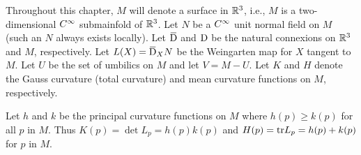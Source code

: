 Throughout this chapter, $M$ will denote a surface in $\mathbb{R}^3$, i.e., $M$ is a two-dimensional $C^\infty$ submainfold of $\mathbb{R}^{3}$. Let $N$ be a $C^\infty$ unit normal field on $M$ (such an $N$ always exists locally). Let $\covariant$ and $\mathrm{D}$ be the natural connexions on $\mathbb{R}^3$ and $M$, respectively. Let $L(X)=\covariant_{X} N$ be the Weingarten map for $X$ tangent to $M$. Let $U$ be the set of umbilics on $M$ and let $V=M-U$. Let $K$ and $H$ denote the Gauss curvature (total curvature) and mean curvature functions on $M$, respectively.

Let $h$ and $k$ be the principal curvature functions on $M$ where $h(p) \geq k(p)$ for all $p$ in $M$. Thus $K(p)=\det L_{p}=h(p) k(p)$ and $H(p)=\mathrm{tr} L_{p}= h(p)+k(p)$ for $p$ in $M$.